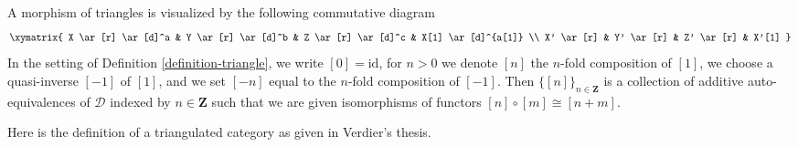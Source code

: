 \noindent
A morphism of triangles is visualized by the following
commutative diagram
$$
\xymatrix{
X \ar[r] \ar[d]^a &
Y \ar[r] \ar[d]^b &
Z \ar[r] \ar[d]^c &
X[1] \ar[d]^{a[1]} \\
X' \ar[r] &
Y' \ar[r] &
Z' \ar[r] &
X'[1]
}
$$
In the setting of Definition \ref{definition-triangle}, we
write $[0] = \text{id}$, for $n > 0$ we denote $[n]$ the $n$-fold
composition of $[1]$, we choose a quasi-inverse $[-1]$ of $[1]$, and
we set $[-n]$ equal to the $n$-fold composition of $[-1]$. Then
$\{[n]\}_{n \in \mathbf{Z}}$ is a collection of additive auto-equivalences
of $\mathcal{D}$ indexed by $n \in \mathbf{Z}$ such that we are given
isomorphisms of functors $[n] \circ [m] \cong [n + m]$.

\medskip\noindent
Here is the definition of a triangulated category as given in
Verdier's thesis.

